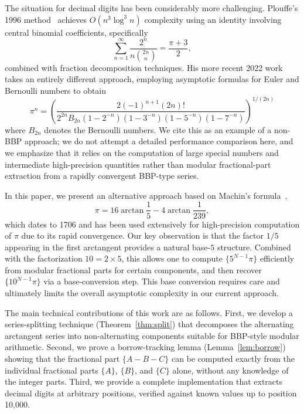 \documentclass[11pt]{article}
\begin{document}
The situation for decimal digits has been considerably more challenging. Plouffe's 1996 method~\cite{plouffe1996} achieves $O(n^3 \log^3 n)$ complexity using an identity involving central binomial coefficients, specifically
\[
\sum_{n=1}^{\infty} \frac{2^n}{n \binom{2n}{n}} = \frac{\pi + 3}{2},
\]
combined with fraction decomposition techniques. His more recent 2022 work~\cite{plouffe2022} takes an entirely different approach, employing asymptotic formulas for Euler and Bernoulli numbers to obtain
\[
\pi^n = \left( \frac{2(-1)^{n+1}(2n)!}{2^{2n} B_{2n}(1-2^{-n})(1-3^{-n})(1-5^{-n})(1-7^{-n})} \right)^{1/(2n)}
\]
where $B_{2n}$ denotes the Bernoulli numbers. We cite this as an example of a non-BBP approach; we do not attempt a detailed performance comparison here, and we emphasize that it relies on the computation of large special numbers and intermediate high-precision quantities rather than modular fractional-part extraction from a rapidly convergent BBP-type series.

In this paper, we present an alternative approach based on Machin's formula~\cite{machin1706},
\begin{equation}\label{eq:machin}
\pi = 16 \arctan\frac{1}{5} - 4 \arctan\frac{1}{239},
\end{equation}
which dates to 1706 and has been used extensively for high-precision computation of $\pi$ due to its rapid convergence. Our key observation is that the factor $1/5$ appearing in the first arctangent provides a natural base-$5$ structure. Combined with the factorization $10 = 2 \times 5$, this allows one to compute $\{5^{N-1}\pi\}$ efficiently from modular fractional parts for certain components, and then recover $\{10^{N-1}\pi\}$ via a base-conversion step. This base conversion requires care and ultimately limits the overall asymptotic complexity in our current approach.

The main technical contributions of this work are as follows. First, we develop a series-splitting technique (Theorem~\ref{thm:split}) that decomposes the alternating arctangent series into non-alternating components suitable for BBP-style modular arithmetic. Second, we prove a borrow-tracking lemma (Lemma~\ref{lem:borrow}) showing that the fractional part $\{A - B - C\}$ can be computed exactly from the individual fractional parts $\{A\}$, $\{B\}$, and $\{C\}$ alone, without any knowledge of the integer parts. Third, we provide a complete implementation that extracts decimal digits at arbitrary positions, verified against known values up to position 10,000.
\end{document}
